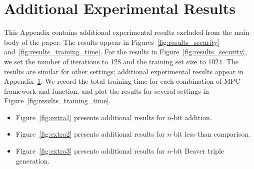 \documentclass[acmlarge, manuscript, screen, review, anonymous, table]{acmart}
\begin{document}




\appendix

\section{Additional Experimental Results}
\label{sec:addit-exper-results}

This Appendix contains additional experimental results excluded from the main body of the paper:
The results appear in Figures~\ref{fig:results_security} and~\ref{fig:results_training_time}. For the results in Figure~\ref{fig:results_security}, we set the number of iterations to 128 and the training set size to 1024. The results are similar for other settings; additional experimental results appear in Appendix~\ref{sec:addit-exper-results}.
We record the total training time for each combination of MPC framework and function, and plot the results for several settings in Figure~\ref{fig:results_training_time}. 
%
\begin{itemize}
\item Figure~\ref{fig:extra1} presents additional results for $n$-bit addition.
\item Figure~\ref{fig:extra2} presents additional results for $n$-bit less-than comparison.
\item Figure~\ref{fig:extra3} presents additional results for $n$-bit Beaver triple generation.
\end{itemize}
\end{document}
